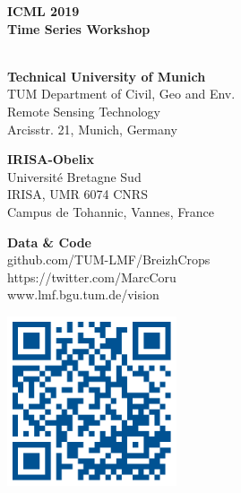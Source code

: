 \documentclass[a0]{tumposter}
\begin{document}


\begin{footer}
	\begin{minipage}{.17\textwidth}
		\textbf{ICML 2019 \\ Time Series Workshop}\\
		\phantom{A} \\ \phantom{B}
	\end{minipage}
	\begin{minipage}{.25\textwidth}
		\textbf{Technical University of Munich}\footnotemark[1]\\
		TUM Department of Civil, Geo and Env. \\
		Remote Sensing Technology \\
		Arcisstr. 21, Munich, Germany
	\end{minipage}
	\begin{minipage}{.25\textwidth}
		\textbf{IRISA-Obelix}\footnotemark[2]\\
		Université Bretagne Sud \\
		IRISA, UMR 6074 CNRS \\
		Campus de Tohannic, Vannes, France
		
	\end{minipage}
	\begin{minipage}{.25\textwidth}
		\textbf{Data \& Code} \\
		{github.com/TUM-LMF/BreizhCrops} \\
		{https://twitter.com/MarcCoru} \\
		www.lmf.bgu.tum.de/vision
	\end{minipage}
	\begin{minipage}{.05\textwidth}
		\hfill\includegraphics[width=5cm]{images/qrcode}
	\end{minipage}

\end{footer}
\end{document}
